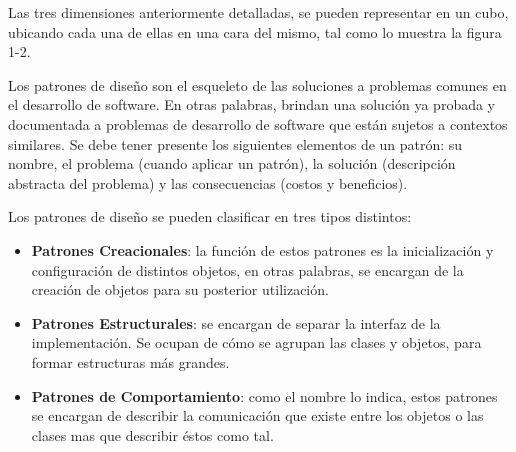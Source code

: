 \documentclass{memoria}
\begin{document}
Las tres dimensiones anteriormente detalladas, se pueden representar en un cubo, ubicando cada una de ellas en una cara del mismo, tal como lo muestra la figura 1-2.

\newpage
{}


Los patrones de diseño son el esqueleto de las soluciones a problemas comunes en el desarrollo de software. En otras palabras, brindan una solución ya probada y documentada a problemas de desarrollo de software que están sujetos a contextos similares. Se debe tener presente los siguientes elementos de un patrón: su nombre, el problema (cuando aplicar un patrón), la solución (descripción abstracta del problema) y las consecuencias (costos y beneficios).

Los patrones de diseño se pueden clasificar en tres tipos distintos:

\begin{itemize}
\item \textbf{Patrones Creacionales}: la función de estos patrones es la inicialización y configuración de distintos objetos, en otras palabras, se encargan de la creación de objetos para su posterior utilización.
\item \textbf{Patrones Estructurales}: se encargan de separar la interfaz de la implementación. Se ocupan de cómo se agrupan las clases y objetos, para formar estructuras más grandes.
\item \textbf{Patrones de Comportamiento}: como el nombre lo indica, estos patrones se encargan de describir la comunicación que existe entre los objetos o las clases mas que describir éstos como tal.
\end{itemize}
\end{document}
